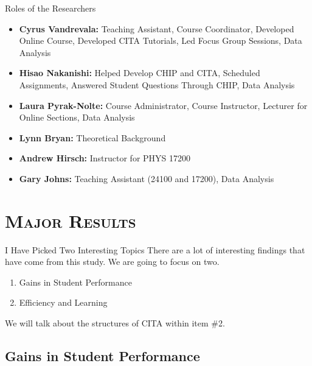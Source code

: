 \documentclass[xcolor=x11names,compress]{beamer}
\begin{document}
\begin{frame}{Roles of the Researchers}
	\begin{itemize}
		\item \textbf{Cyrus Vandrevala:} Teaching Assistant, Course Coordinator, Developed Online Course, Developed CITA Tutorials, Led Focus Group Sessions, Data Analysis
		\vspace{2mm}
		\item \textbf{Hisao Nakanishi:} Helped Develop CHIP and CITA, Scheduled Assignments, Answered Student Questions Through CHIP, Data Analysis
		\vspace{2mm}
		\item \textbf{Laura Pyrak-Nolte:} Course Administrator, Course Instructor, Lecturer for Online Sections, Data Analysis
		\vspace{2mm}
		\item \textbf{Lynn Bryan:} Theoretical Background
		\vspace{2mm}
		\item \textbf{Andrew Hirsch:} Instructor for PHYS 17200
		\vspace{2mm}
		\item \textbf{Gary Johns:} Teaching Assistant (24100 and 17200), Data Analysis
	\end{itemize}
\end{frame}


\section{\scshape Major Results}

\begin{frame}{I Have Picked Two Interesting Topics}
	There are a lot of interesting findings that have come from this study. We are going to focus on two.
	\vspace{3mm}
	\begin{enumerate}
		\item Gains in Student Performance
		\item Efficiency and Learning
	\end{enumerate}
	\vspace{5mm}
	We will talk about the structures of CITA within item \#2.
\end{frame}

\subsection{Gains in Student Performance}
\end{document}
